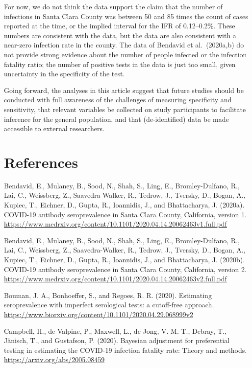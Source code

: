 \documentclass[11pt]{article}
\begin{document}
For now, we do not think the data support the claim that the number of infections in Santa Clara County was between  50 and 85 times the count of cases reported at the time, or the implied interval for the IFR of 0.12--0.2\%.  These numbers are consistent with the data, but the data are also consistent with a near-zero infection rate in the county.  The data of Bendavid et al.\ (2020a,b) do not provide strong evidence about the number of people infected or the infection fatality ratio; the number of positive tests in the data is just too small, given uncertainty in the specificity of the test.

Going forward, the analyses in this article suggest that future studies should be conducted with full awareness of the challenges of measuring specificity and sensitivity, that relevant variables be collected on study participants to facilitate inference for the general population, and that (de-identified) data be made accessible to external researchers.


\section*{References}

\noindent

\bibitem  Bendavid, E., Mulaney, B., Sood, N., Shah, S., Ling, E., Bromley-Dulfano, R., Lai, C.,  Weissberg, Z., Saavedra-Walker, R., Tedrow, J., Tversky, D., Bogan, A., Kupiec, T., Eichner, D., Gupta, R., Ioannidis, J., and Bhattacharya, J. (2020a).  COVID-19 antibody seroprevalence in Santa Clara County, California, version 1. {\small \url{https://www.medrxiv.org/content/10.1101/2020.04.14.20062463v1.full.pdf}}

\bibitem  Bendavid, E., Mulaney, B., Sood, N., Shah, S., Ling, E., Bromley-Dulfano, R., Lai, C.,  Weissberg, Z., Saavedra-Walker, R., Tedrow, J., Tversky, D., Bogan, A., Kupiec, T., Eichner, D., Gupta, R., Ioannidis, J., and Bhattacharya, J. (2020b).  COVID-19 antibody seroprevalence in Santa Clara County, California, version 2. {\small \url{https://www.medrxiv.org/content/10.1101/2020.04.14.20062463v2.full.pdf}}

\bibitem Bouman, J. A., Bonhoeffer, S., and Regoes, R. R.  (2020).  Estimating seroprevalence with imperfect serological tests: a cutoff-free approach.  {\small \url{https://www.biorxiv.org/content/10.1101/2020.04.29.068999v2}}

\bibitem Campbell, H., de Valpine, P., Maxwell, L., de Jong, V. M. T., Debray, T., Jänisch, T., and Gustafson, P. (2020).  Bayesian adjustment for preferential testing in estimating the COVID-19 infection fatality rate: Theory and methods.  {\small \url{https://arxiv.org/abs/2005.08459}}
\end{document}
